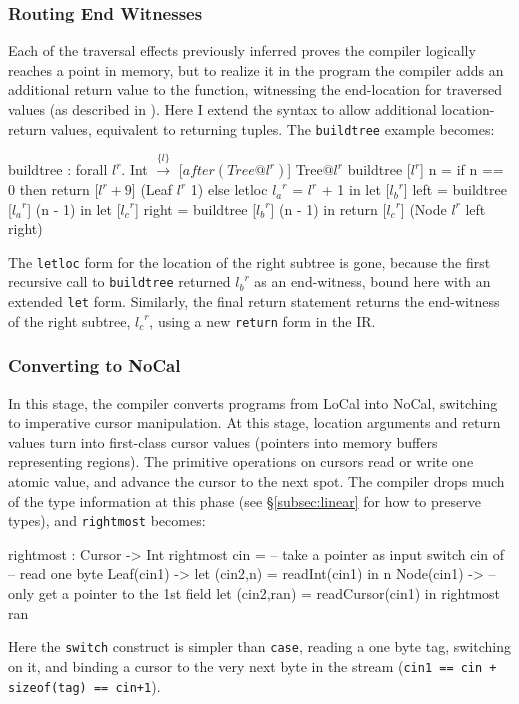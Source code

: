 \documentclass[showabstract,showacknowledgments,showpreface,showdedication,school]{iuphd}
\makeatletter
\theoremstyle{nonumberplain}
\newcommand{\sysname}[0]{LoCal\xspace}
\newcommand{\ourcalc}[0]{\sysname}
\newcommand{\lamcur}[0]{NoCal\xspace}
\newcommand{\locreg}[2]{\ensuremath{{#1}^{#2}}}
\newcommand{\tyatlocreg}[3]{#1 \ensuremath{@} \locreg{#2}{#3}}
\newcommand{\secref}[1]{\S\ref{#1}}
\newcommand{\il}[1]{\lstinline[style=inline,mathescape=true];#1;}
\makeatother
\begin{document}
\subsubsection{Routing End Witnesses}
\label{sec:route-ends}


Each of the traversal effects previously inferred proves the compiler logically reaches a
point in memory, but to realize it in the program the compiler adds an
additional return value to the function, witnessing the end-location for
traversed values (as described in \cite{ecoop17-gibbon}).
Here I extend the syntax to allow additional location-return values,
equivalent to returning tuples.  The \il{buildtree} example becomes:

\begin{code}
buildtree : forall $l^r$. Int $\xrightarrow{\{l\}}$ [$\mathit{after}(\tyatlocreg{Tree}{l}{r})$] Tree$\locreg{@l}{r}$
buildtree [$\locreg{l}{r}$]  n =
  if n == 0 then return [$\locreg{l}{r}+9$] (Leaf $\locreg{l}{r}$ 1)
  else letloc $\locreg{l_a}{r}$ = $\locreg{l}{r}$ + 1 in
       let [$\locreg{l_b}{r}$] left = buildtree [$\locreg{l_a}{r}$] (n - 1) in
       let [$\locreg{l_c}{r}$] right = buildtree [$\locreg{l_b}{r}$] (n - 1) in
       return [$\locreg{l_c}{r}$] (Node $\locreg{l}{r}$ left right)
\end{code}

The \il{letloc} form for the location of the right subtree is gone, because
the first recursive call to \il{buildtree} returned $\locreg{l_b}{r}$ as an end-witness,
bound here with an extended \il{let} form.
Similarly, the final return statement returns the end-witness of the right subtree,
$\locreg{l_c}{r}$, using a new \il{return} form in the IR.

\subsubsection{Converting to \lamcur}
\label{subsubsec:cursorize}

In this stage, the compiler converts programs from \ourcalc{} into \lamcur{}, switching to
imperative cursor manipulation.
At this stage, location arguments and return values turn into first-class cursor
values (pointers into memory buffers representing regions).  The primitive
operations on cursors read or write one atomic value, and advance the cursor to
the next spot.  The compiler drops much of the type information at this phase (see \secref{subsec:linear} for how to preserve types), and
\il{rightmost} becomes:
\begin{code}
rightmost : Cursor -> Int
rightmost cin =   -- take a pointer as input
  switch cin of   -- read one byte
    Leaf(cin1)  ->
      let (cin2,n) = readInt(cin1) in n
    Node(cin1)  -> -- only get a pointer to the 1st field
      let (cin2,ran) = readCursor(cin1) in
      rightmost ran
\end{code}\vspace{-1mm}
Here the \il{switch} construct is simpler than \il{case},
reading a one byte tag, switching on
it, and binding a cursor to the very next byte in the stream
(\il{cin1 == cin + sizeof(tag) == cin+1}).
\end{document}
